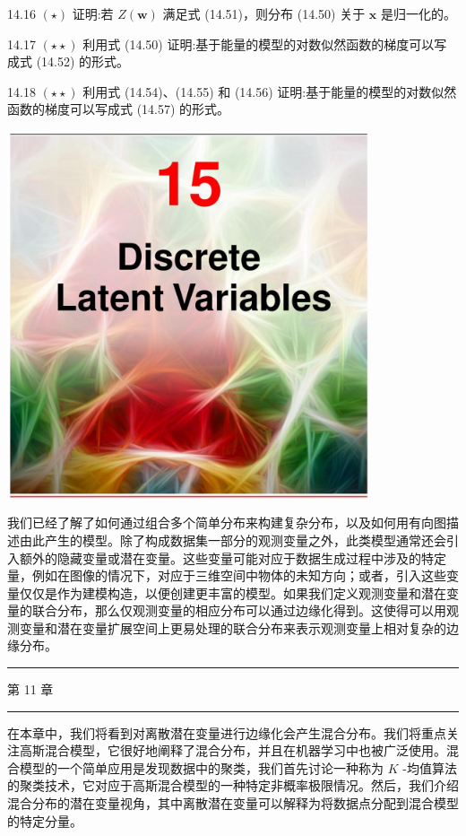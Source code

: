 \documentclass[10pt]{article}
\newcommand{\HRule}{\begin{center}\rule{0.9\linewidth}{0.2mm}\end{center}}
\begin{document}
14.16 \(\left( \star \right)\) 证明:若 \(Z\left( \mathbf{w}\right)\) 满足式 (14.51)，则分布 (14.50) 关于 \(\mathbf{x}\) 是归一化的。

14.17 \(\left( {\star  \star  }\right)\) 利用式 (14.50) 证明:基于能量的模型的对数似然函数的梯度可以写成式 (14.52) 的形式。

14.18 \(\left( {\star  \star  }\right)\) 利用式 (14.54)、(14.55) 和 (14.56) 证明:基于能量的模型的对数似然函数的梯度可以写成式 (14.57) 的形式。

\begin{center}
\includegraphics[max width=0.8\textwidth]{images/0194e279-9b28-703a-88f4-c3ac21e2010d_478_473_348_1075_1089_0.jpg}
\end{center}
\hspace*{3em} 

我们已经了解了如何通过组合多个简单分布来构建复杂分布，以及如何用有向图描述由此产生的模型。除了构成数据集一部分的观测变量之外，此类模型通常还会引入额外的隐藏变量或潜在变量。这些变量可能对应于数据生成过程中涉及的特定量，例如在图像的情况下，对应于三维空间中物体的未知方向；或者，引入这些变量仅仅是作为建模构造，以便创建更丰富的模型。如果我们定义观测变量和潜在变量的联合分布，那么仅观测变量的相应分布可以通过边缘化得到。这使得可以用观测变量和潜在变量扩展空间上更易处理的联合分布来表示观测变量上相对复杂的边缘分布。

\HRule

第 11 章

\HRule

在本章中，我们将看到对离散潜在变量进行边缘化会产生混合分布。我们将重点关注高斯混合模型，它很好地阐释了混合分布，并且在机器学习中也被广泛使用。混合模型的一个简单应用是发现数据中的聚类，我们首先讨论一种称为 \(K\) -均值算法的聚类技术，它对应于高斯混合模型的一种特定非概率极限情况。然后，我们介绍混合分布的潜在变量视角，其中离散潜在变量可以解释为将数据点分配到混合模型的特定分量。
\end{document}
